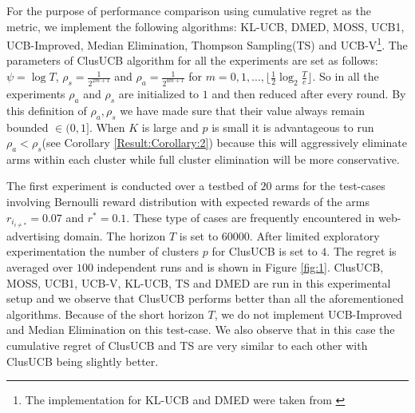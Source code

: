 For the purpose of performance comparison using cumulative regret as the metric, we implement the following algorithms:  KL-UCB\cite{garivier2011kl}, DMED\cite{honda2010asymptotically}, MOSS\cite{audibert2009minimax}, UCB1\cite{auer2002finite}, UCB-Improved\cite{auer2010ucb}, Median Elimination\cite{even2006action}, Thompson Sampling(TS)\cite{agrawal2011analysis} and UCB-V\cite{audibert2009exploration}\footnote{The implementation for KL-UCB and DMED were taken from \cite{CapGarKau12}}. The parameters of ClusUCB algorithm for all the experiments are set as follows: $\psi=\log T$, $\rho_{s}=\frac{1}{2^{2m+1}}$ and $\rho_{a}=\frac{1}{2^{4m+1}}$ for $m=0,1,..., \lfloor \frac{1}{2}\log_{2} \frac{T}{e}\rfloor$. So in all the experiments $\rho_{a}$ and $\rho_{s}$ are initialized to $1$ and then reduced after every round. By this definition of $\rho_{a},\rho_{s}$ we have made sure that their value always remain bounded $\in(0,1]$. When $K$ is large and $p$ is small it is advantageous to run $\rho_{a} < \rho_{s}$(see 
Corollary \ref{Result:Corollary:2}) because this will aggressively eliminate arms within each cluster while full cluster elimination will be more conservative. 


The first experiment is conducted over a testbed of $20$ arms for the test-cases involving Bernoulli reward distribution with expected rewards of the arms $r_{i_{{i}\neq {*}}}=0.07$ and $r^{*}=0.1$. These type of cases are frequently encountered in web-advertising domain. The horizon $T$ is set to $60000$. After limited exploratory experimentation the number of clusters $p$ for ClusUCB is set to $4$. The regret is averaged over $100$ independent runs and is shown in Figure \ref{fig:1}. 
ClusUCB, MOSS, UCB1, UCB-V, KL-UCB, TS and DMED are run in this experimental setup and we observe that ClusUCB performs better than all the aforementioned algorithms. Because of the short horizon $T$, we do not implement UCB-Improved and Median Elimination on this test-case. We also observe that in this case the cumulative regret of ClusUCB and TS are very similar to each other with ClusUCB being slightly better.

